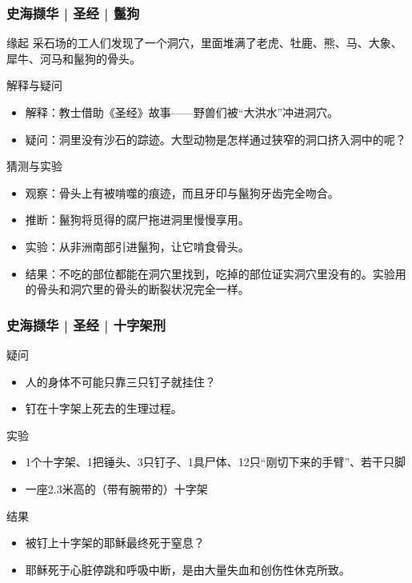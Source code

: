 \begin{frame}
  \frametitle{史海撷华 | 圣经 | 鬣狗}
  \begin{block}{缘起}
采石场的工人们发现了一个洞穴，里面堆满了老虎、牡鹿、熊、马、大象、犀牛、河马和鬣狗的骨头。
  \end{block}
  \vspace{-0.5em}
  \pause
  \begin{block}{解释与疑问}
    \begin{itemize}
      \item 解释：教士借助《圣经》故事——野兽们被“大洪水”冲进洞穴。
      \item 疑问：洞里没有沙石的踪迹。大型动物是怎样通过狭窄的洞口挤入洞中的呢？
    \end{itemize}
  \end{block}
  \vspace{-0.5em}
  \pause
  \begin{block}{猜测与实验}
    \begin{itemize}
      \item 观察：骨头上有被啃噬的痕迹，而且牙印与鬣狗牙齿完全吻合。
      \item 推断：鬣狗将觅得的腐尸拖进洞里慢慢享用。
      \item 实验：从非洲南部引进鬣狗，让它啃食骨头。
      \item 结果：不吃的部位都能在洞穴里找到，吃掉的部位证实洞穴里没有的。实验用的骨头和洞穴里的骨头的断裂状况完全一样。
    \end{itemize}
  \end{block}
\end{frame}

\begin{frame}
  \frametitle{史海撷华 | 圣经 | 十字架刑}
  \begin{block}{疑问}
    \begin{itemize}
      \item 人的身体不可能只靠三只钉子就挂住？
      \item 钉在十字架上死去的生理过程。
    \end{itemize}
  \end{block}
  \pause
  \begin{block}{实验}
    \begin{itemize}
      \item 1个十字架、1把锤头、3只钉子、1具尸体、12只“刚切下来的手臂”、若干只脚
      \item 一座2.3米高的（带有腕带的）十字架
    \end{itemize}
  \end{block}
  \pause
  \begin{block}{结果}
    \begin{itemize}
      \item 被钉上十字架的耶稣最终死于窒息？
      \item 耶稣死于心脏停跳和呼吸中断，是由大量失血和创伤性休克所致。
    \end{itemize}
  \end{block}
\end{frame}

